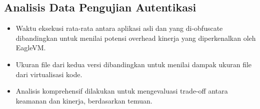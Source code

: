 \subsection{Analisis Data Pengujian Autentikasi}
\begin{itemize}
  \item {} Waktu eksekusi rata-rata antara aplikasi asli dan yang di-obfuscate dibandingkan untuk menilai potensi overhead kinerja yang diperkenalkan oleh EagleVM.
  \item {} Ukuran file dari kedua versi dibandingkan untuk menilai dampak ukuran file dari virtualisasi kode.
  \item {} Analisis komprehensif dilakukan untuk mengevaluasi trade-off antara keamanan dan kinerja, berdasarkan temuan.
\end{itemize}
